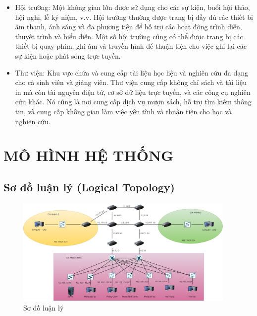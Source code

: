 \documentclass[12pt, a4paper]{article}
\begin{document}
\begin{flushleft}
\begin{itemize}[leftmargin=1.7cm, itemsep=0pt, topsep=0pt]
\begin{itemize}[leftmargin=1cm, itemsep=0pt, topsep=0pt]
				\item Hội trường: Một không gian lớn được sử dụng cho các sự kiện, buổi hội thảo, hội nghị, lễ kỷ niệm, v.v. Hội trường thường được trang bị đầy đủ các thiết bị âm thanh, ánh sáng và đa phương tiện để hỗ trợ các hoạt động trình diễn, thuyết trình và biểu diễn. Một số hội trường cũng có thể được trang bị các thiết bị quay phim, ghi âm và truyền hình để thuận tiện cho việc ghi lại các sự kiện hoặc phát sóng trực tuyến.\\
				\item Thư viện: Khu vực chứa và cung cấp tài liệu học liệu và nghiên cứu đa dạng cho cả sinh viên và giảng viên. Thư viện cung cấp không chỉ sách và tài liệu in mà còn tài nguyên điện tử, cơ sở dữ liệu trực tuyến, và các công cụ nghiên cứu khác. Nó cũng là nơi cung cấp dịch vụ mượn sách, hỗ trợ tìm kiếm thông tin, và cung cấp không gian làm việc yên tĩnh và thuận tiện cho học và nghiên cứu. \
			\end{itemize}
		\end{itemize}
	\end{flushleft}
	
	\newpage
	\section{MÔ HÌNH HỆ THỐNG}
	\subsection{Sơ đồ luận lý (Logical Topology)}
	\begin{figure}[H]
		\centering
		\includegraphics[width=0.95\textwidth]{sodolyluan.png}
		\caption{Sơ đồ luận lý} 
	\end{figure}
\end{document}
